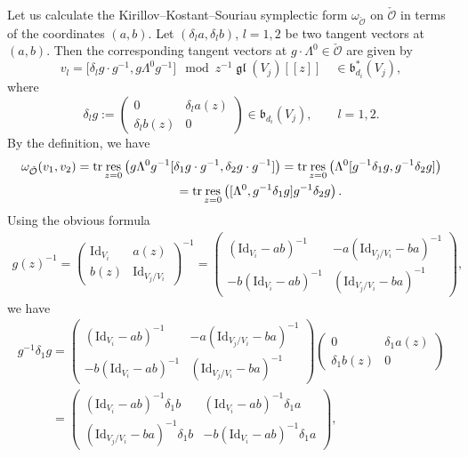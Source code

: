 \documentclass[pdftex]{sigma}
\numberwithin{equation}{section}
\theoremstyle{definition}
\newcommand{\gl}{\operatorname{\mathfrak{gl}}}
\newcommand{\frb}{\mathfrak{b}}
\newcommand{\tr}{\operatorname{tr}}
\newcommand{\unit}{\mathrm{Id}}
\newcommand{\res}{\operatorname*{res}}
\newcommand{\bO}{\mathcal{O}}
\begin{document}
Let us calculate
the Kirillov--Kostant--Souriau symplectic form $\omega_{\check{\bO}}$ on $\check{\bO}$
in terms of the coordinates $(a,b)$.
Let $(\delta_l a, \delta_l b)$, $l=1,2$ be two tangent vectors
at $(a,b)$.
Then the corresponding tangent vectors
at $g \cdot \Lambda^0 \in \check{\bO}$ are given by
\[
v_l = \big[\delta_l g \cdot g^{-1}, g \Lambda^0 g^{-1}\big]
\mod z^{-1}\gl(V_j)[[z]]
\quad \in \frb_{d_i}^*(V_j),
\]
where
\[
\delta_l g := \begin{pmatrix}
0 & \delta_l a(z) \\
\delta_l b(z) & 0
\end{pmatrix} \in \frb_{d_i}(V_j), \qquad l=1,2.
\]
By the def\/inition, we have
\begin{gather}
\omega_{\check{\bO}} (v_1,v_2)  = \tr \res_{z=0} \left( g \Lambda^0 g^{-1}
[\delta_1 g \cdot g^{-1}, \delta_2 g \cdot g^{-1}] \right)
 =\tr \res_{z=0} \left( \Lambda^0
[g^{-1}\delta_1 g, g^{-1}\delta_2 g] \right) \notag\\
\phantom{\omega_{\check{\bO}} (v_1,v_2)}{}
= \tr \res_{z=0} \left( [\Lambda^0,
g^{-1}\delta_1 g] g^{-1}\delta_2 g \right). \label{eq:KKS1}
\end{gather}
Using the obvious formula
\begin{gather}\label{eq:inverse}
g(z)^{-1} = \begin{pmatrix}
\unit_{V_i} & a(z) \\
b(z) & \unit_{V_j/V_i}
\end{pmatrix}^{-1}
=\begin{pmatrix}
(\unit_{V_i}-ab)^{-1} & -a(\unit_{V_j/V_i}-ba)^{-1} \\
-b(\unit_{V_i}-ab)^{-1} & (\unit_{V_j/V_i}-ba)^{-1}
\end{pmatrix},
\end{gather}
we have
\begin{gather*}
g^{-1} \delta_1 g  = \begin{pmatrix}
(\unit_{V_i}-ab)^{-1} & -a(\unit_{V_j/V_i}-ba)^{-1} \\
-b(\unit_{V_i}-ab)^{-1} & (\unit_{V_j/V_i}-ba)^{-1}
\end{pmatrix}
\begin{pmatrix}
0 & \delta_1 a(z) \\
\delta_1 b(z) & 0
\end{pmatrix} \\
\phantom{g^{-1} \delta_1 g}{} =
\begin{pmatrix}
(\unit_{V_i}-ab)^{-1}\delta_1 b & (\unit_{V_i}-ab)^{-1}\delta_1 a \\
(\unit_{V_j/V_i}-ba)^{-1}\delta_1 b & -b(\unit_{V_i}-ab)^{-1}\delta_1 a
\end{pmatrix},
\end{gather*}
\end{document}
